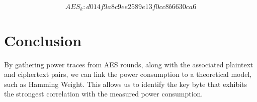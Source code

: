 \documentclass[12pt, letterpaper, oneside]{report}
\begin{document}
$$AES_k: d014f9a8c9ee2589e13f0cc8b6630ca6$$

\chapter{Conclusion}

By gathering power traces from AES rounds, along with the associated plaintext and ciphertext pairs, we can link the power consumption to a theoretical model, such as Hamming Weight. This allows us to identify the key byte that exhibits the strongest correlation with the measured power consumption. \\ 
\end{document}
